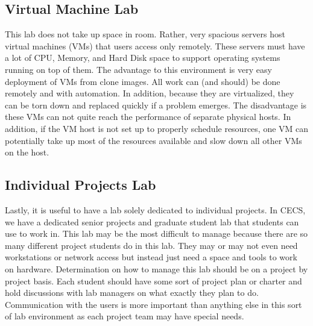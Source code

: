 \subsection{Virtual Machine Lab}
This lab does not take up space in room.  Rather, very spacious servers host virtual machines (VMs) that users access only remotely.  These servers must have a lot of CPU, Memory, and Hard Disk space to support operating systems running on top of them.  The advantage to this environment is very easy deployment of VMs from clone images.  All work can (and should) be done remotely and with automation.  In addition, because they are virtualized, they can be torn down and replaced quickly if a problem emerges.  The disadvantage is these VMs can not quite reach the performance of separate physical hosts.  In addition, if the VM host is not set up to properly schedule resources, one VM can potentially take up most of the resources available and slow down all other VMs on the host.  
\subsection{Individual Projects Lab}
Lastly, it is useful to have a lab solely dedicated to individual projects.  In CECS, we have a dedicated senior projects and graduate student lab that students can use to work in.  This lab may be the most difficult to manage because there are so many different project students do in this lab.  They may or may not even need workstations or network access but instead just need a space and tools to work on hardware.  Determination on how to manage this lab should be on a project by project basis.  Each student should have some sort of project plan or charter and hold discussions with lab managers on what exactly they plan to do.  Communication with the users is more important than anything else in this sort of lab environment as each project team may have special needs.  
